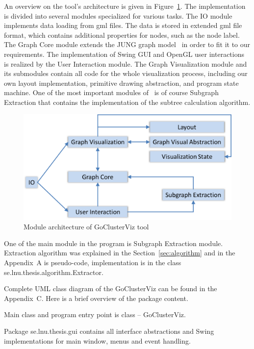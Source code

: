 An overview on the tool's architecture is given in Figure~\ref{fig:modules}. The implementation is divided into several modules specialized for various tasks. The \textsf{IO} module implements data loading from gml files. The data is stored in extended gml file format, which contains additional properties for nodes, such as the node label. The \textsf{Graph Core} module extends the JUNG graph model~\cite{JUNG} in order to fit it to our requirements. The implementation of Swing GUI and OpenGL user interactions is realized by the \textsf{User Interaction} module. The \textsf{Graph Visualization} module and its submodules contain all code for the whole visualization process, including our own layout implementation, primitive drawing abstraction, and program state machine. One of the most important modules of \tool\ is of course \textsf{Subgraph Extraction} that contains the implementation of the subtree calculation algorithm.

\begin{figure}[h!]
\centering
\includegraphics[scale=0.6]{pictures/modules.png}
\caption{Module architecture of GoClusterViz tool}
\label{fig:modules}
\end{figure}

One of the main module in the program is \textsf{Subgraph Extraction} module. Extraction algorithm was explained in the Section~\ref{sec:algorithm} and in the Appendix~A is pseudo-code, implementation is in the class \textsf{se.lnu.thesis.algorithm.Extractor}.

Complete UML class diagram of the GoClusterViz can be found in the Appendix~C. Here is a brief overview of the package content.

Main class and program entry point is class -- \textsf{GoClusterViz}.

Package \textsf{se.lnu.thesis.gui} contains all interface abstractions and Swing implementations for main window, menus and event handling.

